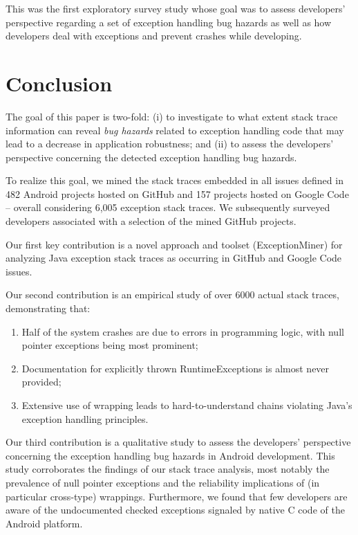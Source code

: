 This was the first exploratory survey study whose
goal was to assess developers' perspective regarding a set of exception handling bug hazards
as well as how developers deal with exceptions and prevent crashes while developing.
 








\section{Conclusion}
\label{sec:conc}

The goal of this paper is two-fold: (i) to investigate 
to what extent stack trace information can reveal \emph{bug hazards} 
related to exception handling code that may lead to a decrease in
application robustness; and (ii) to assess the developers' perspective
concerning the detected exception handling bug hazards.

To realize this goal, we mined the stack 
traces embedded in all issues defined in 482 Android projects hosted on GitHub and 
157 projects hosted on Google Code -- overall considering 6,005
exception stack traces. We subsequently surveyed developers associated with 
a selection of 
the mined GitHub projects.

Our first key contribution is
a novel approach and toolset (ExceptionMiner) for analyzing Java
  exception stack traces as occurring in GitHub and Google Code
  issues.

Our second contribution is
an empirical study of over 6000 actual stack traces,
  demonstrating that:
\begin{enumerate} 
  \item Half of the system crashes are due to errors
  in programming logic, with null pointer exceptions being most
  prominent;
  \item Documentation for explicitly thrown RuntimeExceptions is almost
  never provided; 
  \item Extensive use of wrapping leads to hard-to-understand chains
  violating Java's exception handling principles.
\end{enumerate}  

Our third contribution is a qualitative study to assess the 
developers' perspective concerning the exception handling 
bug hazards in Android development.
This study corroborates the findings of our stack trace analysis, most notably the prevalence
of null pointer exceptions and the reliability implications of (in particular cross-type) wrappings.
Furthermore, we found that few developers are aware of the undocumented checked exceptions signaled by native C code of the Android platform.

